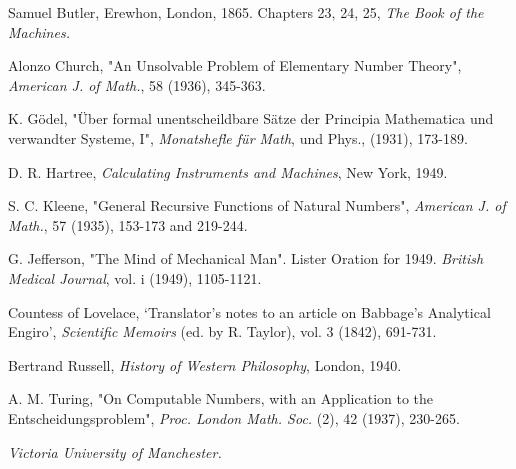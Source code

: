 \documentclass[12pt]{article}
\begin{document}
    \begin{hangparas}{3em}{1}
        Samuel Butler, Erewhon, London, 1865. Chapters 23, 24, 25, \textit{The Book of the Machines.}

        Alonzo Church, "An Unsolvable Problem of Elementary Number Theory", \textit{American J. of Math.}, 58 (1936), 345-363.

        K. Gödel, "Über formal unentscheildbare Sätze der Principia Mathematica und verwandter Systeme, I", \textit{Monatshefle für Math}, und Phys., (1931), 173-189.

        D. R. Hartree, \textit{Calculating Instruments and Machines}, New York, 1949.

        S. C. Kleene, "General Recursive Functions of Natural Numbers", \textit{American J. of Math.}, 57 (1935), 153-173 and 219-244.

        G. Jefferson, "The Mind of Mechanical Man". Lister Oration for 1949. \textit{British Medical Journal}, vol. i (1949), 1105-1121.

        Countess of Lovelace, ‘Translator's notes to an article on Babbage's Analytical Engiro', \textit{Scientific Memoirs} (ed. by R. Taylor), vol. 3 (1842), 691-731.

        Bertrand Russell, \textit{History of Western Philosophy}, London, 1940.

        A. M. Turing, "On Computable Numbers, with an Application to the Entscheidungsproblem", \textit{Proc. London Math. Soc.} (2), 42 (1937), 230-265.

        \textit{Victoria University of Manchester.}

    \end{hangparas}
    
\end{document}
